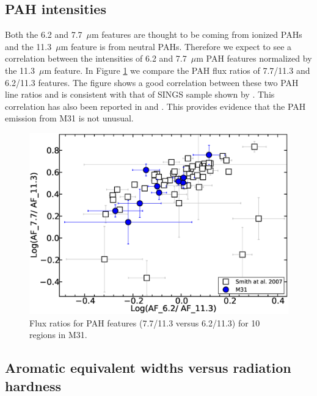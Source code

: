 \subsection{PAH intensities}
\label{sect:pah_ratios}

Both the 6.2 and 7.7~$\mu$m features are thought to be coming from ionized PAHs and the 11.3~$\mu$m feature is from neutral PAHs. Therefore we expect to see a correlation between the intensities of 6.2 and 7.7~$\mu$m PAH features normalized by the 11.3~$\mu$m feature. In Figure \ref{PAHlines} we compare the PAH flux ratios of 7.7/11.3  and 6.2/11.3 features. The figure shows a good correlation between these two PAH line ratios and is consistent with that of SINGS sample shown by \citet{Smith:2007lr}. This correlation has also been reported in \citet{Galliano2008} and \citet{Vermeij2002}. This provides evidence that the PAH emission from M31 is not unusual. 

\begin{figure}
\centering
\includegraphics[scale = 0.25]{./SINGSnMy.eps}
\caption{Flux ratios for PAH features (7.7/11.3 versus 6.2/11.3) for 10 regions in M31.}
\label{PAHlines}
\end{figure}

\subsection{Aromatic equivalent widths versus radiation hardness}
\label{sect:eqw_rh}

